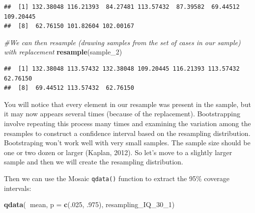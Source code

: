 \documentclass[]{book}
\newenvironment{Shaded}{\begin{snugshade}}{\end{snugshade}}
\newcommand{\CommentTok}[1]{\textcolor[rgb]{0.56,0.35,0.01}{\textit{#1}}}
\newcommand{\DataTypeTok}[1]{\textcolor[rgb]{0.13,0.29,0.53}{#1}}
\newcommand{\DecValTok}[1]{\textcolor[rgb]{0.00,0.00,0.81}{#1}}
\newcommand{\FloatTok}[1]{\textcolor[rgb]{0.00,0.00,0.81}{#1}}
\newcommand{\KeywordTok}[1]{\textcolor[rgb]{0.13,0.29,0.53}{\textbf{#1}}}
\newcommand{\NormalTok}[1]{#1}
\newcommand{\OperatorTok}[1]{\textcolor[rgb]{0.81,0.36,0.00}{\textbf{#1}}}
\newcommand{\StringTok}[1]{\textcolor[rgb]{0.31,0.60,0.02}{#1}}
\theoremstyle{definition}
\theoremstyle{definition}
\theoremstyle{definition}
\theoremstyle{remark}
\begin{document}
\begin{verbatim}
##  [1] 132.38048 116.21393  84.27481 113.57432  87.39582  69.44512 109.20445
##  [8]  62.76150 101.82604 102.00167
\end{verbatim}

\begin{Shaded}
\begin{Highlighting}[]
\CommentTok{#We can then resample (drawing samples from the set of cases in our sample) with replacement}
\KeywordTok{resample}\NormalTok{(sample_}\DecValTok{2}\NormalTok{)}
\end{Highlighting}
\end{Shaded}

\begin{verbatim}
##  [1] 132.38048 113.57432 132.38048 109.20445 116.21393 113.57432  62.76150
##  [8]  69.44512 113.57432  62.76150
\end{verbatim}

You will notice that every element in our resample was present in the
sample, but it may now appears several times (because of the
replacement). Bootstrapping involve repeating this process many times
and examining the variation among the resamples to construct a
confidence interval based on the resampling distribution. Bootstraping
won't work well with very small samples. The sample size should be one
or two dozen or larger (Kaplan, 2012). So let's move to a slightly
larger sample and then we will create the resampling distribution.

\begin{Shaded}
\end{Shaded}

Then we can use the Mosaic \texttt{qdata()} function to extract the 95\%
coverage intervals:

\begin{Shaded}
\begin{Highlighting}[]
\KeywordTok{qdata}\NormalTok{(}\OperatorTok{~}\NormalTok{mean, }\DataTypeTok{p =} \KeywordTok{c}\NormalTok{(.}\DecValTok{025}\NormalTok{, }\FloatTok{.975}\NormalTok{), resampling_IQ_}\DecValTok{30}\NormalTok{_}\DecValTok{1}\NormalTok{)}
\end{Highlighting}
\end{Shaded}
\end{document}
